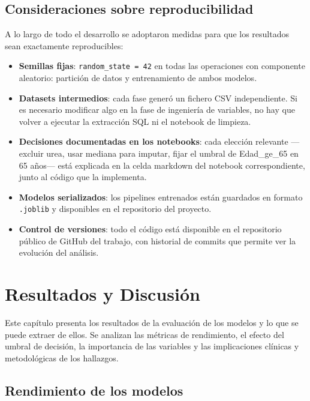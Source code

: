 \documentclass[12pt, a4paper, oneside]{report}
\begin{document}
\section{Consideraciones sobre reproducibilidad}

A lo largo de todo el desarrollo se adoptaron medidas para que los resultados sean exactamente reproducibles:

\begin{itemize}
    \item \textbf{Semillas fijas}: \texttt{random\_state = 42} en todas las operaciones con componente aleatorio: partición de datos y entrenamiento de ambos modelos.
    \item \textbf{Datasets intermedios}: cada fase generó un fichero CSV independiente. Si es necesario modificar algo en la fase de ingeniería de variables, no hay que volver a ejecutar la extracción SQL ni el notebook de limpieza.
    \item \textbf{Decisiones documentadas en los notebooks}: cada elección relevante —excluir urea, usar mediana para imputar, fijar el umbral de Edad\_ge\_65 en 65 años— está explicada en la celda markdown del notebook correspondiente, junto al código que la implementa.
    \item \textbf{Modelos serializados}: los pipelines entrenados están guardados en formato \texttt{.joblib} y disponibles en el repositorio del proyecto.
    \item \textbf{Control de versiones}: todo el código está disponible en el repositorio público de GitHub del trabajo, con historial de commits que permite ver la evolución del análisis.
\end{itemize}

\chapter{Resultados y Discusión}
\label{chap:resultadosdiscusion}

Este capítulo presenta los resultados de la evaluación de los modelos y lo que se puede extraer de ellos. Se analizan las métricas de rendimiento, el efecto del umbral de decisión, la importancia de las variables y las implicaciones clínicas y metodológicas de los hallazgos.

\section{Rendimiento de los modelos}
\label{sec:rendimiento}
\end{document}
